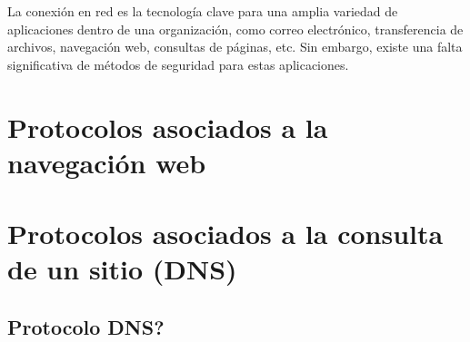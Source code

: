 

La conexión en red es la tecnología clave para una amplia variedad 
de aplicaciones dentro de una organización, como correo electrónico, 
transferencia de archivos, navegación web, consultas de páginas, etc.
Sin embargo, existe una falta significativa de métodos de seguridad 
para estas aplicaciones.
\section{Protocolos asociados a la navegación web}
    


\section{Protocolos asociados a la consulta de un sitio (DNS)}
    \subsection{Protocolo DNS?} 





